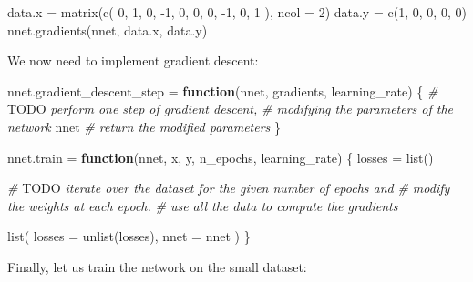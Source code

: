 \documentclass[
  a4paper,
]{article}
\newenvironment{Shaded}{\begin{snugshade}}{\end{snugshade}}
\newcommand{\AlertTok}[1]{\textcolor[rgb]{0.94,0.16,0.16}{#1}}
\newcommand{\AttributeTok}[1]{\textcolor[rgb]{0.77,0.63,0.00}{#1}}
\newcommand{\CommentTok}[1]{\textcolor[rgb]{0.56,0.35,0.01}{\textit{#1}}}
\newcommand{\ControlFlowTok}[1]{\textcolor[rgb]{0.13,0.29,0.53}{\textbf{#1}}}
\newcommand{\DecValTok}[1]{\textcolor[rgb]{0.00,0.00,0.81}{#1}}
\newcommand{\FunctionTok}[1]{\textcolor[rgb]{0.00,0.00,0.00}{#1}}
\newcommand{\NormalTok}[1]{#1}
\newcommand{\OtherTok}[1]{\textcolor[rgb]{0.56,0.35,0.01}{#1}}
\newcommand{\SpecialCharTok}[1]{\textcolor[rgb]{0.00,0.00,0.00}{#1}}
\begin{document}
\begin{Shaded}
\begin{Highlighting}[]
\NormalTok{data.x }\OtherTok{=} \FunctionTok{matrix}\NormalTok{(}\FunctionTok{c}\NormalTok{(}
  \DecValTok{0}\NormalTok{, }\DecValTok{1}\NormalTok{, }\DecValTok{0}\NormalTok{, }\SpecialCharTok{{-}}\DecValTok{1}\NormalTok{, }\DecValTok{0}\NormalTok{,}
  \DecValTok{0}\NormalTok{, }\DecValTok{0}\NormalTok{, }\SpecialCharTok{{-}}\DecValTok{1}\NormalTok{, }\DecValTok{0}\NormalTok{, }\DecValTok{1}
\NormalTok{), }\AttributeTok{ncol =} \DecValTok{2}\NormalTok{)}
\NormalTok{data.y }\OtherTok{=} \FunctionTok{c}\NormalTok{(}\DecValTok{1}\NormalTok{, }\DecValTok{0}\NormalTok{, }\DecValTok{0}\NormalTok{, }\DecValTok{0}\NormalTok{, }\DecValTok{0}\NormalTok{)}
\FunctionTok{nnet.gradients}\NormalTok{(nnet, data.x, data.y)}
\end{Highlighting}
\end{Shaded}

We now need to implement gradient descent:

\begin{Shaded}
\begin{Highlighting}[]
\NormalTok{nnet.gradient\_descent\_step }\OtherTok{=} \ControlFlowTok{function}\NormalTok{(nnet, gradients, learning\_rate) \{}
  \CommentTok{\# }\AlertTok{TODO}\CommentTok{ perform one step of gradient descent,}
  \CommentTok{\# modifying the parameters of the network}
\NormalTok{  nnet  }\CommentTok{\# return the modified parameters}
\NormalTok{\}}


\NormalTok{nnet.train }\OtherTok{=} \ControlFlowTok{function}\NormalTok{(nnet, x, y, n\_epochs, learning\_rate) \{}
\NormalTok{  losses }\OtherTok{=} \FunctionTok{list}\NormalTok{()}
  
  \CommentTok{\# }\AlertTok{TODO}\CommentTok{ iterate over the dataset for the given number of epochs and}
  \CommentTok{\# modify the weights at each epoch.}
  \CommentTok{\# use all the data to compute the gradients}
  
  \FunctionTok{list}\NormalTok{(}
    \AttributeTok{losses =} \FunctionTok{unlist}\NormalTok{(losses),}
    \AttributeTok{nnet =}\NormalTok{ nnet}
\NormalTok{  )}
\NormalTok{\}}
\end{Highlighting}
\end{Shaded}

Finally, let us train the network on the small dataset:
\end{document}
